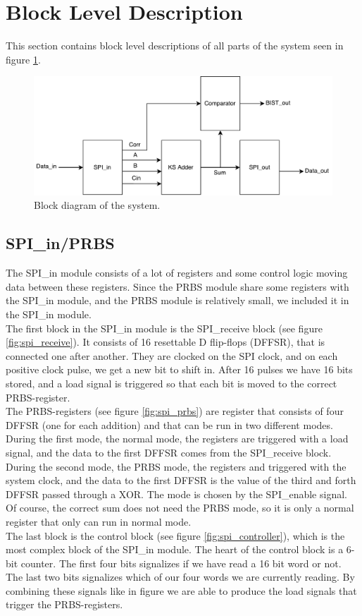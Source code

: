 \section{Block Level Description} \label{sec:block_level}
This section contains block level descriptions of all parts of the system seen in figure \ref{fig:top_level}.

\begin{figure}[H]
  \centering
  \captionsetup{justification=centering}
  \includegraphics[scale=0.5]{../figures/TOP.pdf}
  \caption{Block diagram of the system.} \label{fig:top_level}
\end{figure}


\subsection{SPI\_in/PRBS}
The SPI\_in module consists of a lot of registers and some control logic moving data between these registers. Since the PRBS module share some registers with the SPI\_in module, and the PRBS module is relatively small, we included it in the SPI\_in module. \\
The first block in the SPI\_in module is the SPI\_receive block (see figure \ref{fig:spi_receive}). It consists of 16 resettable D flip-flops (DFFSR), that is connected one after another. They are clocked on the SPI clock, and on each positive clock pulse, we get a new bit to shift in. After 16 pulses we have 16 bits stored, and a load signal is triggered so that each bit is moved to the correct PRBS-register. \\
The PRBS-registers (see figure \ref{fig:spi_prbs}) are register that consists of four DFFSR (one for each addition) and that can be run in two different modes. During the first mode, the normal mode, the registers are triggered with a load signal, and the data to the first DFFSR comes from the SPI\_receive block. During the second mode, the PRBS mode, the registers and triggered with the system clock, and the data to the first DFFSR is the value of the third and forth DFFSR passed through a XOR. The mode is chosen by the SPI\_enable signal. Of course, the correct sum does not need the PRBS mode, so it is only a normal register that only can run in normal mode.\\
The last block is the control block (see figure \ref{fig:spi_controller}), which is the most complex block of the SPI\_in module. The heart of the control block is a 6-bit counter. The first four bits signalizes if we have read a 16 bit word or not. The last two bits signalizes which of our four words we are currently reading. By combining these signals like in figure we are able to produce the load signals that trigger the PRBS-registers.

